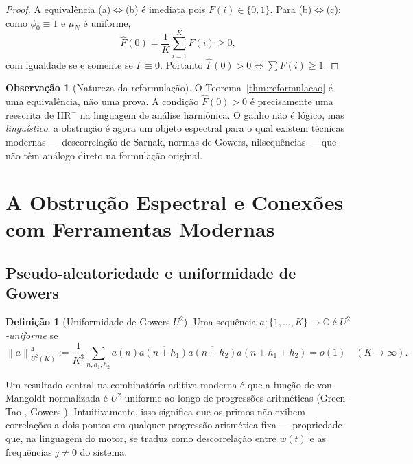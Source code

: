 \documentclass[12pt,a4paper]{article}
\theoremstyle{definition}
\newtheorem{definition}[theorem]{Definição}
\newtheorem{remark}[theorem]{Observação}
\newcommand{\C}{\mathbb{C}}
\newcommand{\HRm}{\mathrm{HR}^{-}}
\newcommand{\norm}[1]{\left\| #1 \right\|}
\begin{document}
	\begin{proof}
		A equivalência (a)$\Leftrightarrow$(b) é imediata pois $F(i) \in
		\{0,1\}$. Para (b)$\Leftrightarrow$(c): como $\phi_0 \equiv 1$ e
		$\mu_N$ é uniforme,
		\[
		\widehat{F}(0) = \frac{1}{K}\sum_{i=1}^K F(i) \geq 0,
		\]
		com igualdade se e somente se $F \equiv 0$. Portanto
		$\widehat{F}(0) > 0 \Leftrightarrow \sum F(i) \geq 1$.
	\end{proof}
	
	\begin{remark}[Natureza da reformulação]
		\label{rem:tautologia}
		O Teorema~\ref{thm:reformulacao} é uma equivalência, não uma prova.
		A condição $\widehat{F}(0) > 0$ é precisamente uma reescrita de $\HRm$
		na linguagem de análise harmônica. O ganho não é lógico, mas
		\emph{linguístico}: a obstrução é agora um objeto espectral para o
		qual existem técnicas modernas — descorrelação de Sarnak, normas de
		Gowers, nilsequências — que não têm análogo direto na formulação
		original.
	\end{remark}
	
	\section{A Obstrução Espectral e Conexões com Ferramentas Modernas}
	\label{sec:obstrucao}
	
	\subsection{Pseudo-aleatoriedade e uniformidade de Gowers}
	
	\begin{definition}[Uniformidade de Gowers $U^2$]
		Uma sequência $a: \{1,\ldots,K\} \to \C$ é \emph{$U^2$-uniforme} se
		\[
		\norm{a}_{U^2(K)}^4 := \frac{1}{K^3}\sum_{n,h_1,h_2}
		a(n)\overline{a(n+h_1)}\overline{a(n+h_2)}a(n+h_1+h_2) = o(1)
		\quad (K \to \infty).
		\]
	\end{definition}
	
	Um resultado central na combinatória aditiva moderna é que a função de
	von Mangoldt normalizada é $U^2$-uniforme ao longo de progressões
	aritméticas (Green-Tao \cite{greentao}, Gowers \cite{gowers}).
	Intuitivamente, isso significa que os primos não exibem correlações a
	dois pontos em qualquer progressão aritmética fixa — propriedade que,
	na linguagem do motor, se traduz como descorrelação entre $w(t)$ e as
	frequências $j \neq 0$ do sistema.
	
\end{document}
